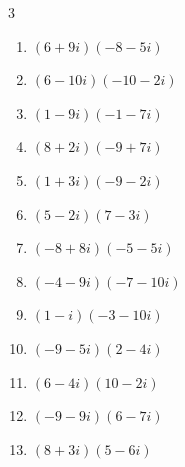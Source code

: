 \begin{multicols}{3}
\begin{enumerate}
  \item $\displaystyle (6+9i)(-8-5i)$

        \phantom{$\displaystyle =-3-102i$}

  \item $\displaystyle (6-10i)(-10-2i)$

        \phantom{$\displaystyle =-80+88i$}

  \item $\displaystyle (1-9i)(-1-7i)$

        \phantom{$\displaystyle =-64+2i$}

  \item $\displaystyle (8+2i)(-9+7i)$

        \phantom{$\displaystyle =-86+38i$}

  \item $\displaystyle (1+3i)(-9-2i)$

        \phantom{$\displaystyle =-3-29i$}

  \item $\displaystyle (5-2i)(7-3i)$

        \phantom{$\displaystyle =29-29i$}

  \item $\displaystyle (-8+8i)(-5-5i)$

        \phantom{$\displaystyle =80$}

  \item $\displaystyle (-4-9i)(-7-10i)$

        \phantom{$\displaystyle =-62+103i$}

  \item $\displaystyle (1-i)(-3-10i)$

        \phantom{$\displaystyle =-13-7i$}

  \item $\displaystyle (-9-5i)(2-4i)$

        \phantom{$\displaystyle =-38+26i$}

  \item $\displaystyle (6-4i)(10-2i)$

        \phantom{$\displaystyle =52-52i$}

\columnbreak %

  \item $\displaystyle (-9-9i)(6-7i)$

        \phantom{$\displaystyle =-117+9i$}

  \item $\displaystyle (8+3i)(5-6i)$


\end{enumerate}
\end{multicols}
